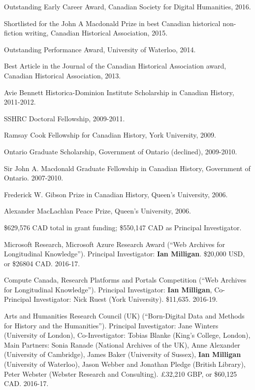 \documentclass[11pt,article,oneside]{memoir}
\begin{document}
\ind Outstanding Early Career Award, Canadian Society for Digital Humanities, 2016.

\ind Shortlisted for the John A Macdonald Prize in best Canadian historical non-fiction writing, Canadian Historical Association, 2015.

\ind Outstanding Performance Award, University of Waterloo, 2014.

\ind Best Article in the Journal of the Canadian Historical Association award, Canadian Historical Association, 2013.

\ind Avie Bennett Historica-Dominion Institute Scholarship in Canadian History, 2011-2012.

\ind SSHRC Doctoral Fellowship, 2009-2011.

\ind Ramsay Cook Fellowship for Canadian History, York University, 2009.

\ind Ontario Graduate Scholarship, Government of Ontario (declined), 2009-2010.

\ind Sir John A. Macdonald Graduate Fellowship in Canadian History, Government of Ontario. 2007-2010.

\ind Frederick W. Gibson Prize in Canadian History, Queen's University, 2006.

\ind Alexander MacLachlan Peace Prize, Queen's University, 2006.
\bigskip 

\medskip

\ind \$629,576 CAD total in grant funding; \$550,147 CAD as Principal Investigator.

\medskip

\ind Microsoft Research, Microsoft Azure Research Award (``Web Archives for Longitudinal Knowledge''). Principal Investigator: \textbf{Ian Milligan}. \$20,000 USD, or \$26804 CAD. 2016-17.

\ind Compute Canada, Research Platforms and Portals Competition (``Web Archives for Longitudinal Knowledge''). Principal Investigator: \textbf{Ian Milligan}, Co-Principal Investigator: Nick Ruest (York University). \$11,635. 2016-19.

\ind Arts and Humanities Research Council (UK) (``Born-Digital Data and Methods for History and the Humanities'').  Principal Investigator: Jane Winters (University of London), Co-Investigator: Tobias Blanke (King's College, London), Main Partners: Sonia Ranade (National Archives of the UK), Anne Alexander (University of Cambridge), James Baker (University of Sussex), \textbf{Ian Milligan} (University of Waterloo), Jason Webber and Jonathan Pledge (British Library), Peter Webster (Webster Research and Consulting). £32,210 GBP, or \$60,125 CAD. 2016-17.
\end{document}
